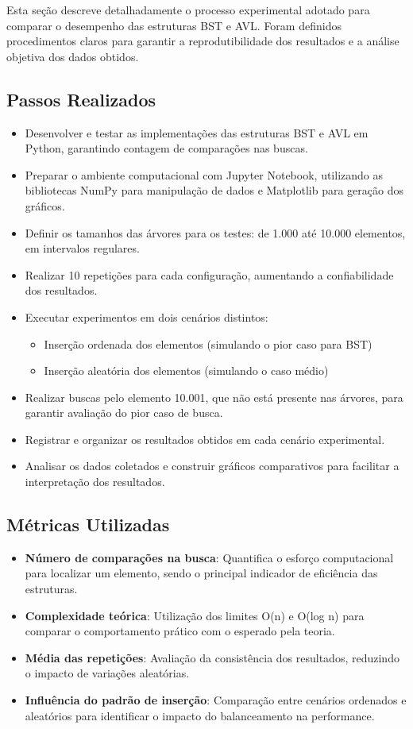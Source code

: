 \documentclass[12pt,a4paper]{article}
\begin{document}
Esta seção descreve detalhadamente o processo experimental adotado para comparar o desempenho das estruturas BST e AVL. Foram definidos procedimentos claros para garantir a reprodutibilidade dos resultados e a análise objetiva dos dados obtidos.

\subsection*{Passos Realizados}
\begin{itemize}
    \item Desenvolver e testar as implementações das estruturas BST e AVL em Python, garantindo contagem de comparações nas buscas.
    \item Preparar o ambiente computacional com Jupyter Notebook, utilizando as bibliotecas NumPy para manipulação de dados e Matplotlib para geração dos gráficos.
    \item Definir os tamanhos das árvores para os testes: de 1.000 até 10.000 elementos, em intervalos regulares.
    \item Realizar 10 repetições para cada configuração, aumentando a confiabilidade dos resultados.
    \item Executar experimentos em dois cenários distintos:
    \begin{itemize}
        \item Inserção ordenada dos elementos (simulando o pior caso para BST)
        \item Inserção aleatória dos elementos (simulando o caso médio)
    \end{itemize}
    \item Realizar buscas pelo elemento 10.001, que não está presente nas árvores, para garantir avaliação do pior caso de busca.
    \item Registrar e organizar os resultados obtidos em cada cenário experimental.
    \item Analisar os dados coletados e construir gráficos comparativos para facilitar a interpretação dos resultados.
\end{itemize}

\subsection*{Métricas Utilizadas}
\begin{itemize}
    \item \textbf{Número de comparações na busca}: Quantifica o esforço computacional para localizar um elemento, sendo o principal indicador de eficiência das estruturas.
    \item \textbf{Complexidade teórica}: Utilização dos limites O(n) e O(log n) para comparar o comportamento prático com o esperado pela teoria.
    \item \textbf{Média das repetições}: Avaliação da consistência dos resultados, reduzindo o impacto de variações aleatórias.
    \item \textbf{Influência do padrão de inserção}: Comparação entre cenários ordenados e aleatórios para identificar o impacto do balanceamento na performance.
\end{itemize}
\end{document}
